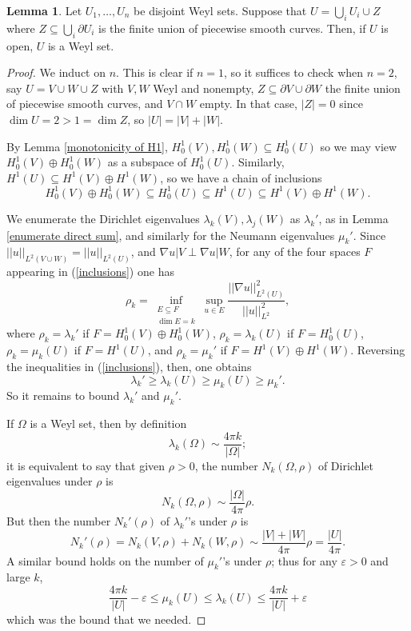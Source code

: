 \documentclass[10pt]{article}
\theoremstyle{definition}
\newtheorem{lemma}{Lemma}[exer]
\begin{document}
\begin{lemma}
Let $U_1, \dots, U_n$ be disjoint Weyl sets. Suppose that $U = \bigcup_i U_i \cup Z$ where $Z \subseteq \bigcup_i \partial U_i$ is the finite union of piecewise smooth curves.
Then, if $U$ is open, $U$ is a Weyl set.
\end{lemma}
\begin{proof}
We induct on $n$. This is clear if $n = 1$, so it suffices to check when $n = 2$, say $U = V \cup W \cup Z$ with $V,W$ Weyl and nonempty, $Z \subseteq \partial V \cup \partial W$ the finite union of piecewise smooth curves, and $V \cap W$ empty.
In that case, $|Z| = 0$ since $\dim U = 2 > 1 = \dim Z$, so $|U| = |V| + |W|$.

By Lemma \ref{monotonicity of H1}, $H^1_0(V), H^1_0(W) \subseteq H^1_0(U)$ so we may view $H^1_0(V) \oplus H^1_0(W)$ as a subspace of $H^1_0(U)$.
Similarly, $H^1(U) \subseteq H^1(V) \oplus H^1(W)$, so we have a chain of inclusions
\begin{equation}
\label{inclusions}
H^1_0(V) \oplus H^1_0(W) \subseteq H^1_0(U) \subseteq H^1(U) \subseteq H^1(V) \oplus H^1(W).
\end{equation}

We enumerate the Dirichlet eigenvalues $\lambda_k(V),\lambda_j(W)$ as $\lambda_k'$, as in Lemma \ref{enumerate direct sum}, and similarly for the Neumann eigenvalues $\mu_k'$.
Since $||u||_{L^2(V \cup W)} = ||u||_{L^2(U)}$, and $\nabla u|V \perp \nabla u|W$, for any of the four spaces $F$ appearing in (\ref{inclusions}) one has
$$\rho_k = \inf_{\substack{E \subseteq F\\\dim E = k}} \sup_{u \in E} \frac{||\nabla u||_{L^2(U)}^2}{||u||_{L^2}^2},$$
where $\rho_k = \lambda_k'$ if $F = H^1_0(V) \oplus H^1_0(W)$, $\rho_k = \lambda_k(U)$ if $F = H^1_0(U)$, $\rho_k = \mu_k(U)$ if $F = H^1(U)$, and $\rho_k = \mu_k'$ if $F = H^1(V) \oplus H^1(W)$.
Reversing the inequalities in (\ref{inclusions}), then, one obtains
$$\lambda_k' \geq \lambda_k(U) \geq \mu_k(U) \geq \mu_k'.$$
So it remains to bound $\lambda_k'$ and $\mu_k'$.

If $\Omega$ is a Weyl set, then by definition
$$\lambda_k(\Omega) \sim \frac{4\pi k}{|\Omega|};$$
it is equivalent to say that given $\rho > 0$, the number $N_k(\Omega, \rho)$ of Dirichlet eigenvalues under $\rho$ is
$$N_k(\Omega, \rho) \sim \frac{|\Omega|}{4\pi} \rho.$$
But then the number $N_k'(\rho)$ of $\lambda_k'$'s under $\rho$ is
$$N_k'(\rho) = N_k(V, \rho) + N_k(W, \rho) \sim \frac{|V| + |W|}{4\pi} \rho = \frac{|U|}{4\pi}.$$
A similar bound holds on the number of $\mu_k'$'s under $\rho$; thus for any $\varepsilon > 0$ and large $k$,
$$\frac{4\pi k}{|U|} - \varepsilon \leq \mu_k(U) \leq \lambda_k(U) \leq \frac{4\pi k}{|U|} + \varepsilon$$
which was the bound that we needed.
\end{proof}
\end{document}
